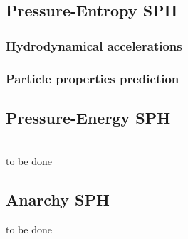 \documentclass[fleqn, usenatbib, useAMS, a4paper]{mnras}
\begin{document}
\subsection{Pressure-Entropy SPH}

\cite{Hopkins2013}
\label{sec:sph:pe}

\subsubsection{Hydrodynamical accelerations}

\subsubsection{Particle properties prediction}

\subsection{Pressure-Energy SPH}
\label{sec:sph:pu}

\cite{Hopkins2013}\\
to be done

\subsection{Anarchy SPH}
\label{sec:sph:anarchy}

to be done



\end{document}

